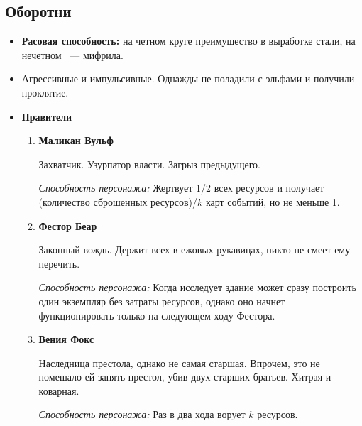 \documentclass[a4paper,12pt,landscape]{article}
\begin{document}
    \subsection{Оборотни}
    \begin{itemize}
      \item \textbf{Расовая способность:} на четном круге преимущество в выработке стали, на нечетном ~--- мифрила.
      \item Агрессивные и импульсивные. Однажды не поладили с эльфами и получили проклятие.
      \item \textbf{Правители}
        \begin{enumerate}
          \item \textbf{Маликан Вульф}
          
          Захватчик. Узурпатор власти. Загрыз предыдущего.
          
          \textit{Способность персонажа:} Жертвует 1/2 всех ресурсов и получает (количество сброшенных ресурсов)/$k$ карт событий, но не меньше 1.
          
          \item \textbf{Фестор Беар}
          
          Законный вождь. Держит всех в ежовых рукавицах, никто не смеет ему перечить.
          
          \textit{Способность персонажа:} Когда исследует здание может сразу построить один экземпляр без затраты ресурсов, однако оно начнет функционировать только на следующем ходу Фестора.
          
          \item \textbf{Вения Фокс}
          
          Наследница престола, однако не самая старшая. Впрочем, это не помешало ей занять престол, убив двух старших братьев. Хитрая и коварная.       
          
          \textit{Способность персонажа:} Раз в два хода ворует $k$ ресурсов.
          \end{enumerate}
    \end{itemize}
    
\end{document}
